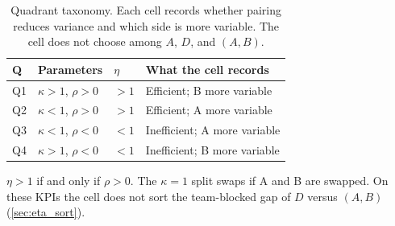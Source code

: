 \begin{table}[p]
  \centering
  \caption{Quadrant taxonomy.
    Each cell records whether pairing reduces variance and which side is more variable.
    The cell does not choose among $A$, $D$, and $(A,B)$.}
  \label{tab:quadrants}
  \begin{tabular}{@{}llll@{}}
    \toprule
    \textbf{Q} & \textbf{Parameters} & $\eta$ & \textbf{What the cell records} \\
    \midrule
    Q1 & $\kappa>1$, $\rho>0$  & $>1$  & Efficient; B more variable \\
    Q2 & $\kappa<1$, $\rho>0$  & $>1$  & Efficient; A more variable \\
    Q3 & $\kappa<1$, $\rho<0$  & $<1$  & Inefficient; A more variable \\
    Q4 & $\kappa>1$, $\rho<0$  & $<1$  & Inefficient; B more variable \\
    \bottomrule
  \end{tabular}

  \medskip
  \begin{minipage}{0.95\linewidth}\small
    $\eta>1$ if and only if $\rho>0$.
    The $\kappa=1$ split swaps if A and B are swapped.
    On these KPIs the cell does not sort the team-blocked gap of $D$ versus $(A,B)$ (\cref{sec:eta_sort}).
  \end{minipage}
\end{table}
